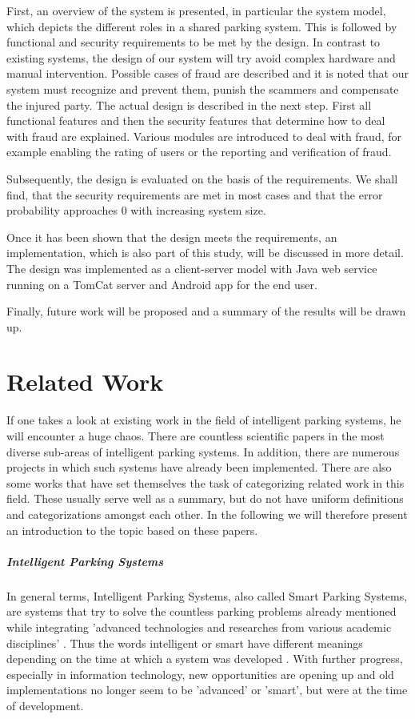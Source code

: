 \documentclass[
a4paper,     %
titlepage,   %
14pt         %
]{scrartcl}  %
\theoremstyle{mystyle}
\begin{document}
First, an overview of the system is presented, in particular the system model, which depicts the different roles in a shared parking system. This is followed by functional and security requirements to be met by the design. In contrast to existing systems, the design of our system will try avoid complex hardware and manual intervention. Possible cases of fraud are described and it is noted that our system must recognize and prevent them, punish the scammers and compensate the injured party. The actual design is described in the next step. First all functional features and then the security features that determine how to deal with fraud are explained. Various modules are introduced to deal with fraud, for example enabling the rating of users or the reporting and verification of fraud. 

Subsequently, the design is evaluated on the basis of the requirements. We shall find, that the security requirements are met in most cases and that the error probability approaches 0 with increasing system size.

Once it has been shown that the design meets the requirements, an implementation, which is also part of this study, will be discussed in more detail. The design was implemented as a client-server model with Java web service running on a TomCat server and Android app for the end user.

Finally, future work will be proposed and a summary of the results will be drawn up.

\section{Related Work}
If one takes a look at existing work in the field of intelligent parking systems, he will encounter a huge chaos. There are countless scientific papers in the most diverse sub-areas of intelligent parking systems. In addition, there are numerous projects in which such systems have already been implemented. There are also some works that have set themselves the task of categorizing related work in this field. These usually serve well as a summary, but do not have uniform definitions and categorizations amongst each other. In the following we will therefore present an introduction to the topic based on these papers.


\subparagraph{Intelligent Parking Systems}
In general terms, Intelligent Parking Systems, also called Smart Parking Systems, are systems that try to solve the countless parking problems already mentioned while integrating 'advanced technologies and researches from various academic disciplines' \cite{idris2009car}. Thus the words intelligent or smart have different meanings depending on the time at which a system was developed \cite{fraifer2016investigation}. With further progress, especially in information technology, new opportunities are opening up and old implementations no longer seem to be 'advanced' or 'smart', but were at the time of development.
\end{document}
